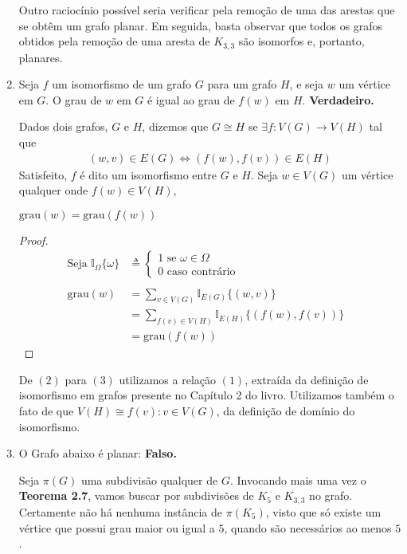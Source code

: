\documentclass{homework}
\begin{document}
\begin{enumerate}[label=\textbf{\arabic*)}]
	Outro raciocínio possível seria verificar pela remoção de uma das arestas que se obtêm um grafo planar. Em seguida, basta observar que todos os grafos obtidos pela remoção de uma aresta de $K_{3, 3}$ são isomorfos e, portanto, planares. \par
	
	\item Seja $f$ um isomorfismo de um grafo $G$ para um grafo $H$, e seja $w$ um vértice em $G$. O grau de $w$ em $G$ é igual ao grau de $f(w)$ em $H$. \textbf{Verdadeiro.} \par
	
	Dados dois grafos, $G$ e $H$, dizemos que $G \cong H$ se $\exists f : V(G) \to V(H)$ tal que
		\begin{align}
			(w, v) \in E(G) \iff (f(w), f(v)) \in E(H)
		\end{align}
	Satisfeito, $f$ é dito um isomorfismo entre $G$ e $H$. Seja $w \in V(G)$ um vértice qualquer onde $f(w) \in V(H)$,
	\begin{supposition}
		$\text{grau}(w) = \text{grau}(f(w))$
	\end{supposition}
	\begin{proof}
		\begin{align}
		\text{Seja } \mathbb{I}_{\Omega}\{\omega\} &\triangleq \begin{cases}
		1 \text{ se } \omega \in \Omega\\
		0 \text{ caso contrário}
		\end{cases} \nonumber \\
		~ \nonumber \\
		\text{grau}(w) &= \sum_{v \in V(G)} \mathbb{I}_{E(G)}\{(w, v)\}\\
					   &= \sum_{f(v) \in V(H)} \mathbb{I}_{E(H)}\{(f(w), f(v))\}\\
					   &= \text{grau}(f(w)) & \nonumber
		\end{align}
	\end{proof}

	De $(2)$ para $(3)$ utilizamos a relação $(1)$, extraída da definição de isomorfismo em grafos presente no Capítulo 2 do livro\cite{jayme:18}. Utilizamos também o fato de que $V(H) \cong {f(v) : v \in V(G)}$, da definição de domínio do isomorfismo. \par
	
	\item O Grafo abaixo é planar: \textbf{Falso.} \par
	
	Seja $\pi(G)$ uma subdivisão qualquer de $G$. Invocando mais uma vez o \textbf{Teorema 2.7}\cite{jayme:18}, vamos buscar por subdivisões de $K_5$ e $K_{3, 3}$ no grafo. Certamente não há nenhuma instância de $\pi(K_5)$, visto que só existe um vértice que possui grau maior ou igual a $5$, quando são necessários ao menos $5$.
	

\end{enumerate}
\end{document}
